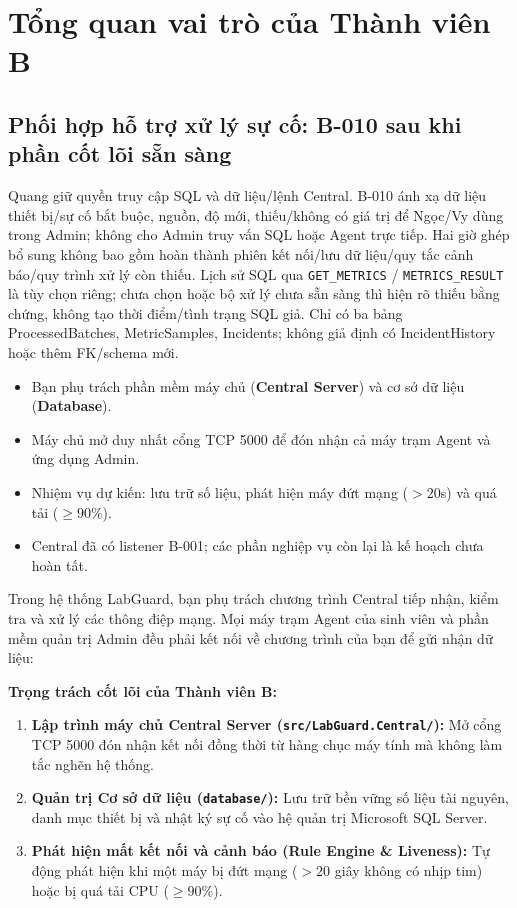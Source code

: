 \documentclass[12pt,a4paper]{article}
\begin{document}
\section{Tổng quan vai trò của Thành viên B}

\subsection*{Phối hợp hỗ trợ xử lý sự cố: B-010 sau khi phần cốt lõi sẵn sàng}
Quang giữ quyền truy cập SQL và dữ liệu/lệnh Central. B-010 ánh xạ dữ liệu thiết bị/sự cố bắt buộc, nguồn, độ mới, thiếu/không có giá trị để Ngọc/Vy dùng trong Admin; không cho Admin truy vấn SQL hoặc Agent trực tiếp. Hai giờ ghép bổ sung không bao gồm hoàn thành phiên kết nối/lưu dữ liệu/quy tắc cảnh báo/quy trình xử lý còn thiếu. Lịch sử SQL qua \texttt{GET\_METRICS} / \texttt{METRICS\_RESULT} là tùy chọn riêng; chưa chọn hoặc bộ xử lý chưa sẵn sàng thì hiện rõ thiếu bằng chứng, không tạo thời điểm/tình trạng SQL giả. Chỉ có ba bảng ProcessedBatches, MetricSamples, Incidents; không giả định có IncidentHistory hoặc thêm FK/schema mới.


\begin{summarybox}
\begin{itemize}[leftmargin=1.5em, itemsep=1pt]
  \item Bạn phụ trách phần mềm máy chủ (\textbf{Central Server}) và cơ sở dữ liệu (\textbf{Database}).
  \item Máy chủ mở duy nhất cổng TCP 5000 để đón nhận cả máy trạm Agent và ứng dụng Admin.
  \item Nhiệm vụ dự kiến: lưu trữ số liệu, phát hiện máy đứt mạng ($>20$s) và quá tải ($\ge 90\%$).
  \item Central đã có listener B-001; các phần nghiệp vụ còn lại là kế hoạch chưa hoàn tất.
\end{itemize}
\end{summarybox}

Trong hệ thống LabGuard, bạn phụ trách chương trình Central tiếp nhận, kiểm tra và xử lý các thông điệp mạng. Mọi máy trạm Agent của sinh viên và phần mềm quản trị Admin đều phải kết nối về chương trình của bạn để gửi nhận dữ liệu:

\begin{conceptbox}
\textbf{Trọng trách cốt lõi của Thành viên B:}
\begin{enumerate}
  \item \textbf{Lập trình máy chủ Central Server (\texttt{src/LabGuard.Central/}):} Mở cổng TCP 5000 đón nhận kết nối đồng thời từ hàng chục máy tính mà không làm tắc nghẽn hệ thống.
  \item \textbf{Quản trị Cơ sở dữ liệu (\texttt{database/}):} Lưu trữ bền vững số liệu tài nguyên, danh mục thiết bị và nhật ký sự cố vào hệ quản trị Microsoft SQL Server.
  \item \textbf{Phát hiện mất kết nối và cảnh báo (Rule Engine \& Liveness):} Tự động phát hiện khi một máy bị đứt mạng ($>20$ giây không có nhịp tim) hoặc bị quá tải CPU ($\ge 90\%$).
\end{enumerate}
\end{conceptbox}
\end{document}
